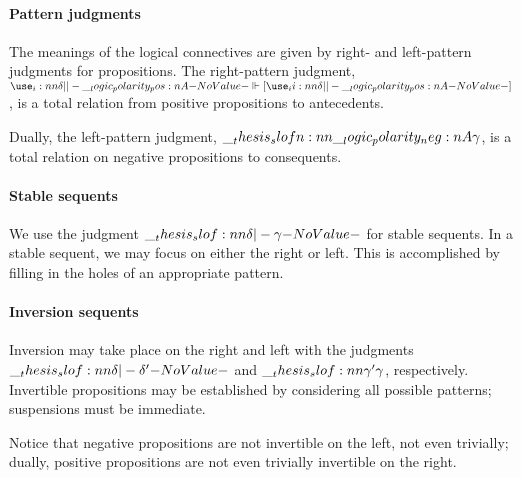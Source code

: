 \paragraph{Pattern judgments}
The meanings of the logical connectives are given by right- and left-pattern judgments for propositions.
The right-pattern judgment, $\slofp{\delta ||- \p{A}}$, is a total relation from positive propositions to antecedents.
Dually, the left-pattern judgment, $\slofn{\n{A} ||- \gamma}$, is a total relation on negative propositions to consequents.

\paragraph{Stable se{q}uents}
We use the judgment $\slof{\delta |- \gamma}$ for stable sequents.
In a stable sequent, we may focus on either the right or left.
This is accomplished by filling in the holes of an appropriate pattern.

\paragraph{Inversion seq\-uents}
Inversion may take place on the right and left with the judgments $\slof{\delta |- \delta'}$ and $\slof{\gamma' |- \gamma}$, respectively.
Invertible propositions may be established by considering all possible patterns; suspensions must be immediate.
Notice that negative propositions are not invertible on the left, not even trivially; dually, positive propositions are not even trivially invertible on the right.


